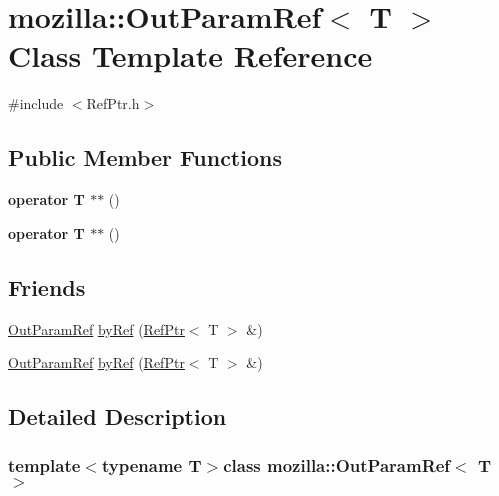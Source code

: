 \hypertarget{classmozilla_1_1_out_param_ref}{\section{mozilla\-:\-:Out\-Param\-Ref$<$ T $>$ Class Template Reference}
\label{classmozilla_1_1_out_param_ref}
}


{\ttfamily \#include $<$Ref\-Ptr.\-h$>$}

\subsection*{Public Member Functions}
\begin{DoxyCompactItemize}
\item 
\hypertarget{classmozilla_1_1_out_param_ref_a3ce02b91bd4fa9f613077721243af0ad}{{\bfseries operator T $\ast$$\ast$} ()}\label{classmozilla_1_1_out_param_ref_a3ce02b91bd4fa9f613077721243af0ad}

\item 
\hypertarget{classmozilla_1_1_out_param_ref_a3ce02b91bd4fa9f613077721243af0ad}{{\bfseries operator T $\ast$$\ast$} ()}\label{classmozilla_1_1_out_param_ref_a3ce02b91bd4fa9f613077721243af0ad}

\end{DoxyCompactItemize}
\subsection*{Friends}
\begin{DoxyCompactItemize}
\item 
\hyperlink{classmozilla_1_1_out_param_ref}{Out\-Param\-Ref} \hyperlink{classmozilla_1_1_out_param_ref_ae836a7d0433fbd103b03a8e5773f3217}{by\-Ref} (\hyperlink{classmozilla_1_1_ref_ptr}{Ref\-Ptr}$<$ T $>$ \&)
\item 
\hyperlink{classmozilla_1_1_out_param_ref}{Out\-Param\-Ref} \hyperlink{classmozilla_1_1_out_param_ref_ae836a7d0433fbd103b03a8e5773f3217}{by\-Ref} (\hyperlink{classmozilla_1_1_ref_ptr}{Ref\-Ptr}$<$ T $>$ \&)
\end{DoxyCompactItemize}


\subsection{Detailed Description}
\subsubsection*{template$<$typename T$>$class mozilla\-::\-Out\-Param\-Ref$<$ T $>$}

